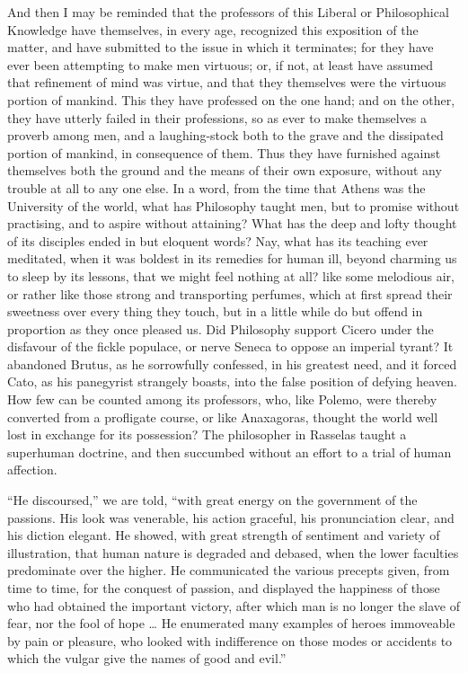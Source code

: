 And then I may be reminded that the professors of this Liberal or
Philosophical Knowledge have themselves, in every age, recognized this
exposition of the matter, and have submitted to the issue in which it
terminates; for they have ever been attempting to make men virtuous;
or, if not, at least have assumed that refinement of mind was virtue,
and that they themselves were the virtuous portion of mankind. This
they have professed on the one hand; and on the other, they have
utterly failed in their professions, so as ever to make themselves a
proverb among men, and a laughing-stock both to the grave and the
dissipated portion of mankind, in consequence of them. Thus they have
furnished against themselves both the ground and the means of their
own exposure, without any trouble at all to any one else. In a word,
from the time that Athens was the University of the world, what has
Philosophy taught men, but to promise without practising, and to
aspire without attaining? What has the deep and lofty thought of its
disciples ended in but eloquent words? Nay, what has its
teaching ever meditated, when it was boldest in its remedies for human
ill, beyond charming us to sleep by its lessons, that we might feel
nothing at all? like some melodious air, or rather like those strong
and transporting perfumes, which at first spread their sweetness over
every thing they touch, but in a little while do but offend in
proportion as they once pleased us. Did Philosophy support Cicero
under the disfavour of the fickle populace, or nerve Seneca to oppose
an imperial tyrant? It abandoned Brutus, as he sorrowfully confessed,
in his greatest need, and it forced Cato, as his panegyrist strangely
boasts, into the false position of defying heaven. How few can be
counted among its professors, who, like Polemo, were thereby converted
from a profligate course, or like Anaxagoras, thought the world well
lost in exchange for its possession? The philosopher in Rasselas
taught a superhuman doctrine, and then succumbed without an effort to
a trial of human affection.

``He discoursed,'' we are told, ``with great energy on
the government of the passions. His look was venerable, his action
graceful, his pronunciation clear, and his diction elegant. He showed,
with great strength of sentiment and variety of illustration, that
human nature is degraded and debased, when the lower faculties
predominate over the higher. He communicated the various precepts
given, from time to time, for the conquest of passion, and displayed
the happiness of those who had obtained the important victory, after
which man is no longer the slave of fear, nor the fool of hope … He
enumerated many examples of heroes immoveable by pain or pleasure, who
looked with indifference on those modes or accidents to which the
vulgar give the names of good and evil.''

